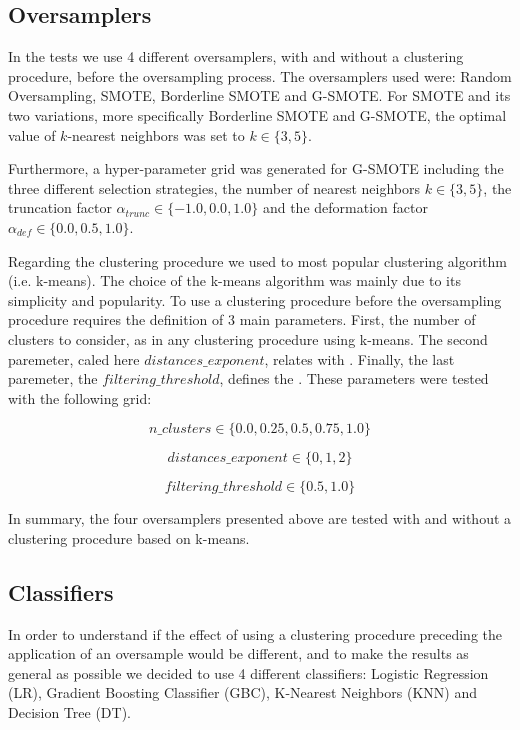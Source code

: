 \documentclass[parskip=full]{scrartcl}
\begin{document}
\subsection{Oversamplers}

In the tests we use 4 different oversamplers, with and without a clustering 
procedure, before the oversampling process. The oversamplers used were: Random 
Oversampling, SMOTE, Borderline SMOTE and G-SMOTE. For SMOTE and its two 
variations, more specifically Borderline SMOTE and G-SMOTE, the optimal value 
of $k$-nearest neighbors was set to $k \in \{3, 5\}$. 

Furthermore, a hyper-parameter grid was generated for G-SMOTE including the 
three different selection strategies, the number of nearest neighbors $k \in \{3, 5\}$, the truncation factor $\alpha_{trunc} \in \{-1.0, 0.0, 1.0\}$ and the deformation factor $\alpha_{def} \in \{0.0, 0.5, 1.0\}$. 

Regarding the clustering procedure we used to most popular clustering algorithm 
(i.e. k-means). The choice of the k-means algorithm was mainly due to its 
simplicity and popularity. To use a clustering procedure before the 
oversampling procedure requires the definition of 3 main parameters. First, the 
number of clusters to consider, as in any clustering procedure using k-means. 
The second paremeter, caled here $distances\_exponent$, relates with . Finally, 
the last paremeter, the $filtering\_threshold$, defines the . These parameters were tested with the following grid:

$$n\_clusters \in \{0.0, 0.25,0.5,0.75, 1.0\}$$

$$distances\_exponent \in \{0, 1, 2\}$$

$$filtering\_threshold \in \{0.5, 1.0\}$$

In summary, the four oversamplers presented above are tested with and without a 
clustering procedure based on k-means.

\subsection{Classifiers}

In order to understand if the effect of using a clustering procedure preceding 
the application of an oversample would be different, and to make the results as 
general as possible we decided to use 4 different classifiers: Logistic 
Regression (LR), Gradient Boosting Classifier (GBC), K-Nearest Neighbors (KNN) 
and Decision Tree (DT). 
\end{document}
